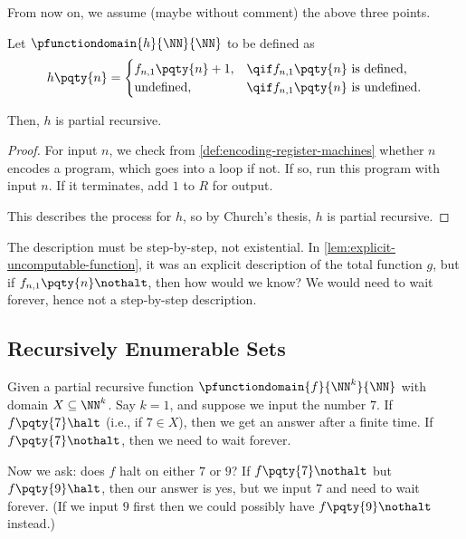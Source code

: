 From now on, we assume (maybe without comment) the above three points.

\begin{lemma}
    \label{lem:computable-partial-function-from-uncomputable-total-function}%
    Let \(\pfunctiondomain{h}{\NN}{\NN}\) to be defined as
    \[
        h\pqty{n} = \begin{cases}
            f_{n, 1} \pqty{n} + 1, & \qif f_{n, 1} \pqty{n} \text{ is defined}, \\
            \text{undefined}, & \qif f_{n, 1} \pqty{n} \text{ is undefined}.
        \end{cases}
    \]

    Then, \(h\) is partial recursive.
\end{lemma}

\begin{proof}
    For input \(n\), we check from \autoref{def:encoding-register-machines} whether \(n\) encodes a program, which goes into a loop if not. If so, run this program with input \(n\). If it terminates, add \(1\) to \(R\) for output.

    This describes the process for \(h\), so by Church's thesis, \(h\) is partial recursive.
\end{proof}

\begin{remark}
    The description must be step-by-step, not existential. In \autoref{lem:explicit-uncomputable-function}, it was an explicit description of the total function \(g\), but if \(f_{n, 1}\pqty{n} \nothalt\), then how would we know? We would need to wait forever, hence not a step-by-step description.
\end{remark}

\subsection{Recursively Enumerable Sets}

Given a partial recursive function \(\pfunctiondomain{f}{\NN^k}{\NN}\) with domain \(X \subseteq \NN^k\). Say \(k = 1\), and suppose we input the number \(7\). If \(f\pqty{7}\halt\) (i.e., if \(7 \in X\)), then we  get an answer after a finite time. If \(f\pqty{7}\nothalt\), then we need to wait forever.

Now we ask: does \(f\) halt on either \(7\) or \(9\)? If \(f\pqty{7}\nothalt\) but \(f\pqty{9}\halt\), then our answer is yes, but we input \(7\) and need to wait forever. (If we input \(9\) first then we could possibly have \(f\pqty{9}\nothalt\) instead.)

